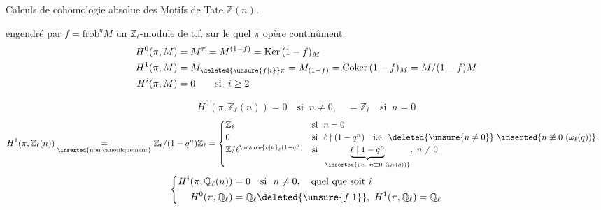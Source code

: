 Calculs de cohomologie absolue des Motifs de Tate $\mathbb{Z}(n)$.



engendré par $f=\mathrm{frob}^{q}$\qquad $M$ un $\mathbb{Z}_\ell$-module de t.f. sur le quel $\pi$ opère continûment.
\[
\begin{aligned}
H^0(\pi,M)&=M^\pi=M^{(1-f)}=\mathrm{Ker}\,(1-f)_M\\
H^1(\pi,M)&=M_{\deleted{\unsure{f|i}}\pi}=M_{(1-f)}=\mathrm{Coker}\,(1-f)_M=M/(1-f)M\\
H^i(\pi,M)&=0\qquad\text{si }\ i\geq 2
\end{aligned}
\]

\[
H^0(\pi,\mathbb{Z}_\ell(n))=0\quad\text{si }\ n\ne0,\quad =\mathbb{Z}_\ell\quad\text{si }\ n=0
\]
\[
\begin{aligned}
H^1(\pi,\mathbb{Z}_\ell(n))&\underset{\text{\inserted{non canoniquement}}}{=}\mathbb{Z}_\ell/(1-q^n)\mathbb{Z}_\ell=\begin{cases}
\mathbb{Z}_\ell&\text{si }\ n=0\\
0&\text{si }\ \ell\nmid(1-q^n)\quad\text{i.e. }\deleted{\unsure{n\ne0}}\ \inserted{n\not\equiv0\ (\omega_\ell(q))}\\
\mathbb{Z}/\ell^{\unsure{v|\nu}_\ell(1-q^n)}&\text{si }\ \underbrace{\ell\mid1-q^n}_{\inserted{\text{i.e. }n\equiv0\ (\omega_\ell(q))}},\ n\ne0
\end{cases}
\end{aligned}
\]
\margin{$\circ\!\!-\!\!-$}
\[
\left\{\begin{aligned}
H^{i}(\pi,\mathbb{Q}_\ell(n))&=0\quad\text{si }\ n\ne0,\quad\text{quel que soit }i\\
H^0(\pi,\mathbb{Q}_\ell)&=\mathbb{Q}_\ell\deleted{\unsure{f|1}},\ H^1(\pi,\mathbb{Q}_\ell)=\mathbb{Q}_\ell
\end{aligned}\right.
\]

